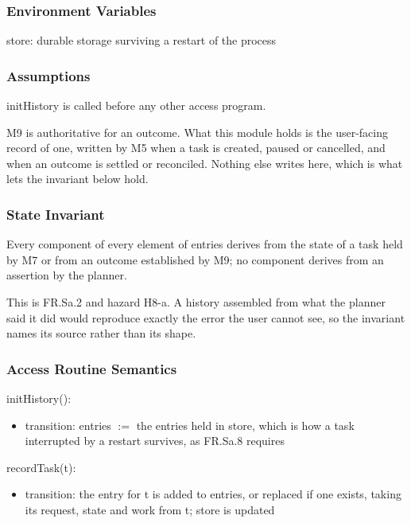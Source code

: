 \documentclass[12pt, titlepage]{article}
\begin{document}
\subsubsection{Environment Variables}

store: durable storage surviving a restart of the process

\subsubsection{Assumptions}

initHistory is called before any other access program.

\noindent M9 is authoritative for an outcome. What this module holds is the
user-facing record of one, written by M5 when a task is created, paused or
cancelled, and when an outcome is settled or reconciled. Nothing else writes
here, which is what lets the invariant below hold.

\subsubsection{State Invariant}

Every component of every element of entries derives from the state of a task
held by M7 or from an outcome established by M9; no component derives from an
assertion by the planner.

\noindent This is FR.Sa.2 and hazard H8-a. A history assembled from what the
planner said it did would reproduce exactly the error the user cannot see, so
the invariant names its source rather than its shape.

\subsubsection{Access Routine Semantics}

\noindent initHistory():
\begin{itemize}
\item transition: entries $:=$ the entries held in store, which is how a task
interrupted by a restart survives, as FR.Sa.8 requires
\end{itemize}

\noindent recordTask(t):
\begin{itemize}
\item transition: the entry for t is added to entries, or replaced if one
exists, taking its request, state and work from t; store is updated
\end{itemize}
\end{document}
